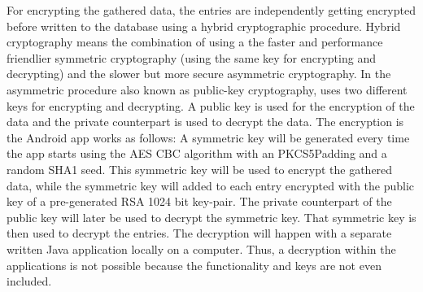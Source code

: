For encrypting the gathered data, the entries are independently getting encrypted before written to the database using a hybrid cryptographic procedure. Hybrid cryptography means the combination of using a the faster and performance friendlier symmetric cryptography (using the same key for encrypting and decrypting) and the slower but more secure asymmetric cryptography. In the asymmetric procedure also known as public-key cryptography, uses two different keys for encrypting and decrypting. A public key is used for the encryption of the data and the private counterpart is used to decrypt the data. 
The encryption is the Android app works as follows:
A symmetric key will be generated every time the app starts using the AES CBC algorithm with an PKCS5Padding and a random SHA1 seed. This symmetric key will be used to encrypt the gathered data, while the symmetric key will added to each entry encrypted with the public key of a pre-generated RSA 1024 bit key-pair. 
The private counterpart of the public key will later be used to decrypt the symmetric key. That symmetric key is then used to decrypt the entries. 
The decryption will happen with a separate written Java application locally on a computer. 
Thus, a decryption within the applications is not possible because the functionality and keys are not even included. 